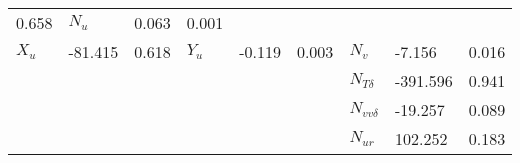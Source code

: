 \begin{table}[h]
\begin{tabular}{|T|T|T|T|T|T|T|T|T|}
0.658
&

\( N_{u} \)
&

0.063
&

0.001
\\


\( X_{u} \)
&

-81.415
&

0.618
&

\( Y_{u} \)
&

-0.119
&

0.003
&

\( N_{v} \)
&

-7.156
&

0.016
\\
&&&&&&

\( N_{T\delta} \)
&

-391.596
&

0.941
\\
&&&&&&

\( N_{vv\delta} \)
&

-19.257
&

0.089
\\
&&&&&&

\( N_{ur} \)
&

102.252
&

0.183
\\
\hline
\end{tabular}

\end{table}

